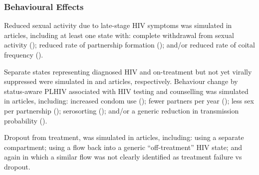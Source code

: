 \subsubsection{Behavioural Effects}
\label{sss:res:beh}
Reduced sexual activity due to late-stage HIV symptoms was simulated in  articles,
including at least one state with:
complete withdrawal from sexual activity ();
reduced rate of partnership formation (); and/or
reduced rate of coital frequency ().
\par
Separate states representing diagnosed HIV and on-treatment but not yet virally suppressed
were simulated in  and  articles, respectively.
Behaviour change by status-aware PLHIV associated with HIV testing and counselling
was simulated in  articles, including:
increased condom use ();
fewer partners per year ();
less sex per partnership ();
serosorting\cite{} (); and/or
a generic reduction in transmission probability ().
\par
Dropout from treatment, was simulated in  articles, including:
 using a separate compartment;
 using a flow back into a generic ``off-treatment'' HIV state; and again
 in which a similar flow was not clearly identified as treatment failure vs dropout.
